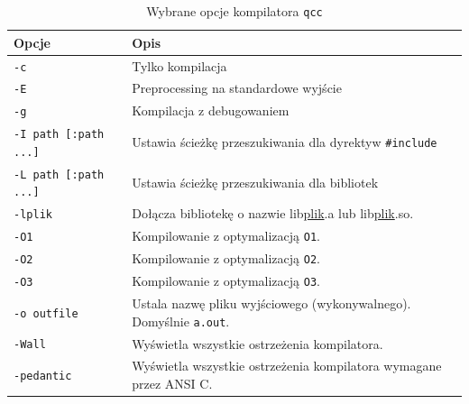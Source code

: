 \begin{table}[h!]
\centering
\caption{Wybrane opcje kompilatora \lstinline[style=MyBashStyle]{qcc}}
\setlength{\arrayrulewidth}{1pt}
\setlength{\tabcolsep}{6pt}
\renewcommand{\arraystretch}{1.2}
\begin{tabular}{ |p{}|p{}|}
\hline \rowcolor{gray}
\textbf{Opcje} & \textbf{Opis} \\ \hline
\mbox{\lstinline[style=MyBashStyle]{-c}} & Tylko kompilacja \\ \hline
\mbox{\lstinline[style=MyBashStyle]{-E}} & Preprocessing na standardowe wyjście \\ \hline
\mbox{\lstinline[style=MyBashStyle]{-g}} & Kompilacja z debugowaniem \\ \hline
\mbox{\lstinline[style=MyBashStyle]{-I path [:path ...]}} & Ustawia ścieżkę przeszukiwania dla dyrektyw \mbox{\lstinline[style=MyBashStyle]{#include}}  \\ \hline
\mbox{\lstinline[style=MyBashStyle]{-L path [:path ...]}} & Ustawia ścieżkę przeszukiwania dla bibliotek  \\ \hline
\mbox{\lstinline[style=MyBashStyle]{-lplik}} & Dołącza bibliotekę o nazwie lib\underline{plik}.a lub lib\underline{plik}.so.  \\ \hline
\mbox{\lstinline[style=MyBashStyle]{-O1}} & Kompilowanie z optymalizacją \mbox{\lstinline[style=MyBashStyle]{O1}}.  \\ \hline
\mbox{\lstinline[style=MyBashStyle]{-O2}} & Kompilowanie z optymalizacją \mbox{\lstinline[style=MyBashStyle]{O2}}.  \\ \hline
\mbox{\lstinline[style=MyBashStyle]{-O3}} & Kompilowanie z optymalizacją \mbox{\lstinline[style=MyBashStyle]{O3}}.  \\ \hline
\mbox{\lstinline[style=MyBashStyle]{-o outfile}} & Ustala nazwę pliku wyjściowego (wykonywalnego). Domyślnie \mbox{\lstinline[style=MyBashStyle]{a.out}}.  \\ \hline
\mbox{\lstinline[style=MyBashStyle]{-Wall}} & Wyświetla wszystkie ostrzeżenia kompilatora.  \\ \hline
\mbox{\lstinline[style=MyBashStyle]{-pedantic}} & Wyświetla wszystkie ostrzeżenia kompilatora wymagane przez ANSI C.  \\ \hline
\end{tabular}
\label{tab:opcjeqcc}
\end{table}


